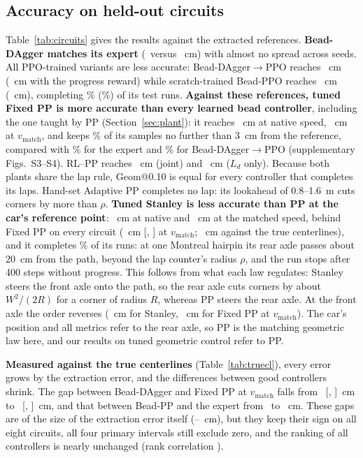 \documentclass{IJCAS}
\begin{document}
\subsection{Accuracy on held-out circuits}
Table~\ref{tab:circuits} gives the results against the extracted references. \textbf{Bead-DAgger matches its expert} (\VrmseDagger\ versus \VrmseExpert~cm) with almost no spread across seeds. All PPO-trained variants are less accurate: Bead-DAgger$\to$PPO reaches \VrmseDP~cm (\VrmseDPacc~cm with the progress reward) while scratch-trained Bead-PPO reaches \VrmsePPO~cm (\VrmsePPOacc~cm), completing \VcompPPO\% (\VcompPPOacc\%) of its test runs. \textbf{Against these references, tuned Fixed PP is more accurate than every learned bead controller}, including the one taught by PP (Section~\ref{sec:plant}): it reaches \VrmseFix~cm at native speed, \VrmseFixM~cm at $v_{\mathrm{match}}$, and keeps \VwithinFix\% of its samples no further than 3~cm from the reference, compared with \VwithinExpert\% for the expert and \VwithinDP\% for Bead-DAgger$\to$PPO (supplementary Figs.~S3--S4). RL--PP reaches \VrmseRL~cm (joint) and \VrmseRLld~cm ($L_d$ only). Because both plants share the lap rule, Geom@0.10 is equal for every controller that completes its laps. Hand-set Adaptive PP completes no lap: its lookahead of 0.8--1.6~m cuts corners by more than $\rho$. \textbf{Tuned Stanley is less accurate than PP at the car's reference point}: \VrmseSt~cm at native and \VrmseStM~cm at the matched speed, behind Fixed PP on every circuit (\VcmpStFixMDiff~cm [\VcmpStFixMLo, \VcmpStFixMHi] at $v_{\mathrm{match}}$; \VtrueStFixMDiff~cm against the true centerlines), and it completes \VcompSt\% of its runs: at one Montreal hairpin its rear axle passes about 20~cm from the path, beyond the lap counter's radius $\rho$, and the run stops after 400 steps without progress. This follows from what each law regulates: Stanley steers the front axle onto the path, so the rear axle cuts corners by about $W^2/(2R)$ for a corner of radius $R$, whereas PP steers the rear axle. At the front axle the order reverses (\VfrontStM~cm for Stanley, \VfrontFixM~cm for Fixed PP at $v_{\mathrm{match}}$). The car's position and all metrics refer to the rear axle, so PP is the matching geometric law here, and our results on tuned geometric control refer to PP.

\textbf{Measured against the true centerlines} (Table~\ref{tab:truecl}), every error grows by the extraction error, and the differences between good controllers shrink. The gap between Bead-DAgger and Fixed PP at $v_{\mathrm{match}}$ falls from \VcmpPoneDiff\ [\VcmpPoneLo, \VcmpPoneHi]~cm to \VtruePoneDiff\ [\VtruePoneLo, \VtruePoneHi]~cm, and that between Bead-PP and the expert from \VcmpPfourDiff\ to \VtruePfourDiff~cm. These gaps are of the size of the extraction error itself (\VextMeanLo--\VextMeanHi~cm), but they keep their sign on all eight circuits, all four primary intervals still exclude zero, and the ranking of all controllers is nearly unchanged (rank correlation \VrankCorr).
\end{document}
